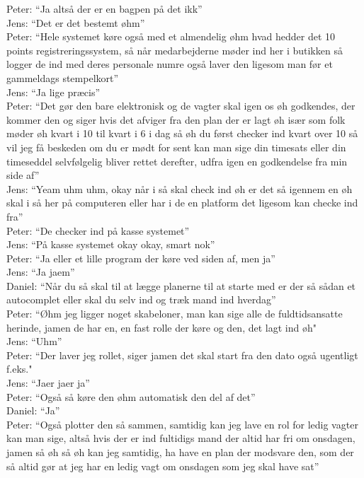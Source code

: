 Peter: “Ja altså der er en bagpen på det ikk”\\
Jens: “Det er det bestemt øhm”\\
Peter: “Hele systemet køre også med et almendelig øhm hvad hedder det 10 points registreringssystem, så når medarbejderne møder ind her i butikken så logger de ind med deres personale numre også laver den ligesom man før et gammeldags stempelkort”\\
Jens: “Ja lige præcis”\\
Peter: “Det gør den bare elektronisk og de vagter skal igen os øh godkendes, der kommer den og siger hvis det afviger fra den plan der er lagt øh især som folk møder øh kvart i 10 til kvart i 6 i dag så øh du først checker ind kvart over 10 så vil jeg få beskeden om du er mødt for sent kan man sige din timesats eller din timeseddel selvfølgelig bliver rettet derefter, udfra igen en godkendelse fra min side af”\\
Jens: “Yeam uhm uhm, okay når i så skal check ind øh er det så igennem en øh skal i så her på computeren eller har i de en platform det ligesom kan checke ind fra”\\
Peter: “De checker ind på kasse systemet”\\
Jens: “På kasse systemet okay okay, smart nok”\\
Peter: “Ja eller et lille program der køre ved siden af, men ja”\\
Jens: “Ja jaem”\\
Daniel: “Når du så skal til at lægge planerne til at starte med er der så sådan et autocomplet eller skal du selv ind og træk mand ind hverdag”\\
Peter: “Øhm jeg ligger noget skabeloner, man kan sige alle de fuldtidsansatte herinde, jamen de har en, en fast rolle der køre og den, det lagt ind øh"\\
Jens: “Uhm”\\
Peter: “Der laver jeg rollet, siger jamen det skal start fra den dato også ugentligt f.eks."\\ 
Jens: “Jaer jaer ja”\\
Peter: “Også så køre den øhm automatisk den del af det”\\
Daniel: “Ja”\\
Peter: “Også plotter den så sammen, samtidig kan jeg lave en rol for ledig vagter kan man sige, altså hvis der er ind fultidigs mand der altid har fri om onsdagen, jamen så øh så øh kan jeg samtidig, ha have en plan der modsvare den, som der så altid gør at jeg har en ledig vagt om onsdagen som jeg skal have sat”\\
